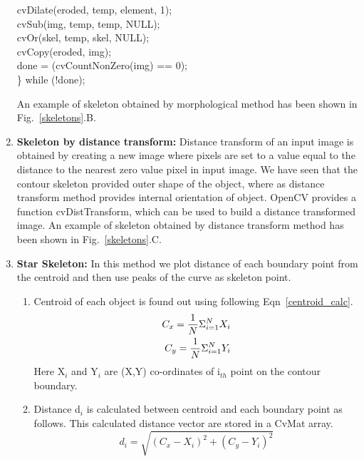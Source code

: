 \begin{enumerate}
{{	\hspace*{1 in}cvDilate(eroded, temp, element, 1);\\
	\hspace*{1 in}cvSub(img, temp, temp, NULL);\\
	\hspace*{1 in}cvOr(skel, temp, skel, NULL);\\
	\hspace*{1 in}cvCopy(eroded, img);\\
	\hspace*{1 in}done = (cvCountNonZero(img) == 0);\\
	\} while (!done);
}} \par
\indent An example of skeleton obtained by morphological method has been
shown in Fig.~\ref{skeletons}.B.
\item \textbf{Skeleton by distance transform:} Distance transform of an
	input image is obtained by creating a new image where pixels are
	set to a value equal to the distance to the nearest zero value
	pixel in input image. We have seen that the contour skeleton
	provided outer shape of the object, where as distance transform
	method provides internal orientation of object. OpenCV provides
	a function cvDistTransform, which can be used to build a
	distance transformed image. An example of skeleton obtained by
	distance transform method has been shown in
	Fig.~\ref{skeletons}.C.
\item \textbf{Star Skeleton:} In this method we plot distance of each
	boundary point from the centroid and then use peaks of the curve
	as skeleton point.
\begin{enumerate}
\item Centroid of each object is found out using following
	Eqn~\ref{centroid_calc}.
	\begin{eqnarray}
	C_x = {1 \over N} \Sigma ^N _{i = 1} X_i \label{centroid_calc}
\nonumber \\
	C_y = {1 \over N} \Sigma ^N _{i = 1} Y_i 
	\end{eqnarray}
Here X$_i$ and Y$_i$ are (X,Y) co-ordinates of i$_{th}$ point on the contour
boundary.
\item Distance d$_i$ is calculated between centroid and each boundary
	point as follows. This calculated distance vector are stored in a
	CvMat array.
	\begin{equation}
	d_i = \sqrt{(C_x - X_i)^2 + (C_y - Y_i)^2} \label{dist_calc}
	\end{equation}


\end{enumerate}
\end{enumerate}
